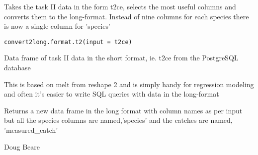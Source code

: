 \documentclass[letterpaper]{book}
\begin{document}
%
\begin{Description}\relax
Takes the task II data in the form t2ce, selects the most useful columns and converts them to the long-format. Instead of nine columns for each species there is now a single column for 'species'
\end{Description}
%
\begin{Usage}
\begin{verbatim}
convert2long.format.t2(input = t2ce)
\end{verbatim}
\end{Usage}
%
\begin{Arguments}
\begin{ldescription}
\item[\code{input}] 
Data frame of task II data in the short format, ie. t2ce from the PostgreSQL database

\end{ldescription}
\end{Arguments}
%
\begin{Details}\relax
This is based on melt from reshape 2 and is simply handy for regression modeling and often it's easier to write SQL queries with data in the long-format
\end{Details}
%
\begin{Value}
Returns a new data frame in the long format with column names as per input but all the species columns are named,'species' and the catches are named, 'measured\_catch'





\end{Value}
%
\begin{Author}\relax
Doug Beare
\end{Author}
%
\end{document}
